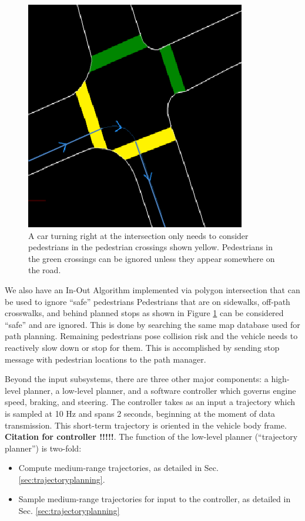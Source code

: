 \documentclass[letterpaper, 10 pt, conference]{ieeeconf}  %
\begin{document}

\begin{figure}[thpb]
  \centering
  \includegraphics[width=0.3\columnwidth]{graphics/IntersectionCrosswalks.png}
  \caption{
    A car turning right at the intersection only needs to consider pedestrians in the pedestrian crossings shown yellow.
    Pedestrians in the green crossings can be ignored unless they appear somewhere on the road.
  }
  \label{fig:intersect}
\end{figure}

We also have an In-Out Algorithm implemented via polygon intersection that can be used to ignore “safe” pedestrians
Pedestrians that are on sidewalks, off-path crosswalks, and behind planned stops as shown in Figure \ref{fig:intersect} can be considered ``safe'' and are ignored.
This is done by searching the same map database used for path planning.
Remaining pedestrians pose collision risk and the vehicle needs to reactively slow down or stop for them.
This is accomplished by sending stop message with pedestrian locations to the path manager.

Beyond the input subsystems, there are three other major components: a high-level planner, a low-level planner, and a software controller which governs engine speed, braking, and steering.
The controller takes as an input a trajectory which is sampled at 10 Hz and spans 2 seconds, beginning at the moment of data transmission.
This short-term trajectory is oriented in the vehicle body frame.
\textbf{Citation for controller !!!!!}.
The function of the low-level planner (``trajectory planner'') is two-fold:
\begin{itemize}
  \item Compute medium-range trajectories, as detailed in Sec. \ref{sec:trajectoryplanning}.
  \item Sample medium-range trajectories for input to the controller, as detailed in Sec. \ref{sec:trajectoryplanning}
\end{itemize}
\end{document}
